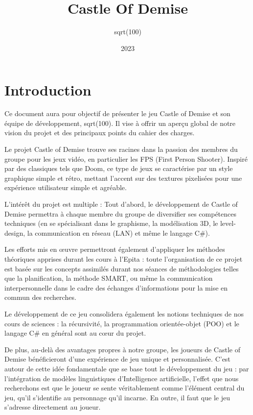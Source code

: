 \documentclass{report}
\author{sqrt(100)}
\title{Castle Of Demise}
\date{2023}
\begin{document}
\maketitle

\doublespacing

\tableofcontents
\singlespacing

\newpage


\section{Introduction}


Ce document aura pour objectif de présenter le jeu Castle of Demise et son équipe de développement, sqrt(100). Il vise à offrir un aperçu global de notre vision du projet et des principaux points du cahier des charges.


Le projet Castle of Demise trouve ses racines dans la passion des membres du groupe pour les jeux vidéo, en particulier les FPS (First Person Shooter). Inspiré par des classiques tels que Doom, ce type de jeux se caractérise par un style graphique simple et rétro, mettant l'accent sur des textures pixelisées pour une expérience utilisateur simple et agréable. \newline 


L’intérêt du projet est multiple : Tout d'abord, le développement de Castle of Demise permettra à chaque membre du groupe de diversifier ses compétences techniques (en se spécialisant dans le graphisme, la modélisation 3D, le level-design, la communication en réseau (LAN) et même le langage C\#). \newline


Les efforts mis en œuvre permettront également d’appliquer les méthodes théoriques apprises durant les cours à l’Epita : toute l’organisation de ce projet est basée sur les concepts assimilés durant nos séances de méthodologies telles que la planification, la méthode SMART, ou même la communication interpersonnelle dans le cadre des échanges d’informations pour la mise en commun des recherches. \newline

Le développement de ce jeu consolidera également les notions techniques de nos cours de sciences : la récursivité, la programmation orientée-objet (POO) et le langage C\# en général sont au cœur du projet. 


De plus, au-delà des avantages propres à notre groupe, les joueurs de Castle of Demise bénéficieront d’une expérience de jeu unique et personnalisée. C’est autour de cette idée fondamentale que se base tout le développement du jeu : par l’intégration de modèles linguistiques d’Intelligence artificielle, l’effet que nous recherchons est que le joueur se sente véritablement comme l’élément central du jeu, qu’il s’identifie au personnage qu’il incarne. En outre, il faut que le jeu s’adresse directement au joueur. \newline
\end{document}
